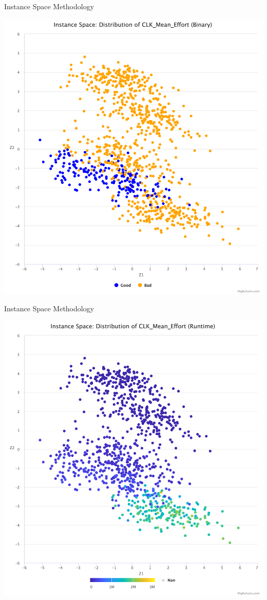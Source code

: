 \documentclass[
  ignorenonframetext,
]{beamer}
\begin{document}
\begin{frame}{Instance Space Methodology}
\protect\hypertarget{instance-space-methodology-1}{}

\begin{center}\includegraphics[width=0.6\linewidth]{./Performance-distribution-binary} \end{center}

\end{frame}

\begin{frame}{Instance Space Methodology}
\protect\hypertarget{instance-space-methodology-2}{}

\begin{center}\includegraphics[width=0.6\linewidth]{./Performance-distribution} \end{center}

\end{frame}
\end{document}
